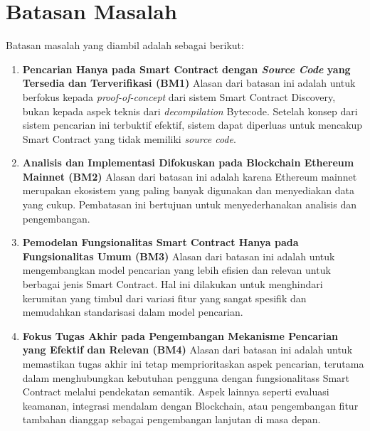\section{Batasan Masalah}
\label{sec:batasan-masalah}


Batasan masalah yang diambil adalah sebagai berikut:

\begin{enumerate}
	\item \textbf{Pencarian Hanya pada Smart Contract dengan \textit{Source Code} yang Tersedia dan Terverifikasi (BM1)} \newline
	      Alasan dari batasan ini adalah untuk berfokus kepada \textit{proof-of-concept} dari sistem Smart Contract Discovery, bukan kepada aspek teknis dari \textit{decompilation} Bytecode. Setelah konsep dari sistem pencarian ini terbuktif efektif, sistem dapat diperluas untuk mencakup Smart Contract yang tidak memiliki \textit{source code}.
	\item \textbf{Analisis dan Implementasi Difokuskan pada Blockchain Ethereum Mainnet (BM2)} \newline
	      Alasan dari batasan ini adalah karena Ethereum mainnet merupakan ekosistem yang paling banyak digunakan dan menyediakan data yang cukup. Pembatasan ini bertujuan untuk menyederhanakan analisis dan pengembangan.
	\item \textbf{Pemodelan Fungsionalitas Smart Contract Hanya pada Fungsionalitas Umum (BM3)} \newline
	      Alasan dari batasan ini adalah untuk mengembangkan model pencarian yang lebih efisien dan relevan untuk berbagai jenis Smart Contract. Hal ini dilakukan untuk menghindari kerumitan yang timbul dari variasi fitur yang sangat spesifik dan memudahkan standarisasi dalam model pencarian.
	\item \textbf{Fokus Tugas Akhir pada Pengembangan Mekanisme Pencarian yang Efektif dan Relevan (BM4)} \newline
	      Alasan dari batasan ini adalah untuk memastikan tugas akhir ini tetap memprioritaskan aspek pencarian, terutama dalam menghubungkan kebutuhan pengguna dengan fungsionalitass Smart Contract melalui pendekatan semantik. Aspek lainnya seperti evaluasi keamanan, integrasi mendalam dengan Blockchain, atau pengembangan fitur tambahan dianggap sebagai pengembangan lanjutan di masa depan.
\end{enumerate}